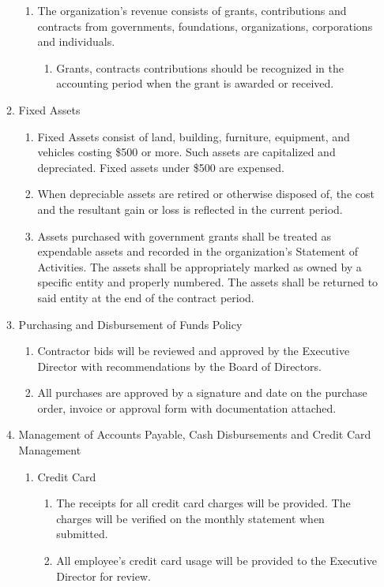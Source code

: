\documentclass{article}
\begin{document}
\begin{enumerate}
\begin{enumerate}
\begin{enumerate}
\item The organization’s revenue consists of grants, contributions and contracts from governments, foundations, organizations, corporations and individuals.
\begin{enumerate}
\item Grants, contracts contributions should be recognized in the accounting period when the grant is awarded or received. 
\end{enumerate}
\end{enumerate}
\item Fixed Assets
\begin{enumerate}
\item Fixed Assets consist of land, building, furniture, equipment, and vehicles costing \$500 or more. Such assets are capitalized and depreciated. Fixed assets under \$500 are expensed.
\item When depreciable assets are retired or otherwise disposed of, the cost and the resultant gain or loss is reflected in the current period.
\item Assets purchased with government grants shall be treated as expendable assets and recorded in the organization's Statement of Activities. The assets shall be appropriately marked as owned by a specific entity and properly numbered. The assets shall be returned to said entity at the end of the contract period.
\end{enumerate}
\item Purchasing and Disbursement of Funds Policy
\begin{enumerate}
\item Contractor bids will be reviewed and approved by the Executive Director with recommendations by the Board of Directors.
\item All purchases are approved by a signature and date on the purchase order, invoice or approval form with documentation attached. 
\end{enumerate}
\item Management of Accounts Payable, Cash Disbursements and Credit Card Management
\begin{enumerate}
\item Credit Card
\begin{enumerate}
\item The receipts for all credit card charges will be provided. The charges will be verified on the monthly statement when submitted.
\item All employee’s credit card usage will be provided to the Executive Director for review.

\end{enumerate}
\end{enumerate}
\end{enumerate}
\end{enumerate}
\end{document}
